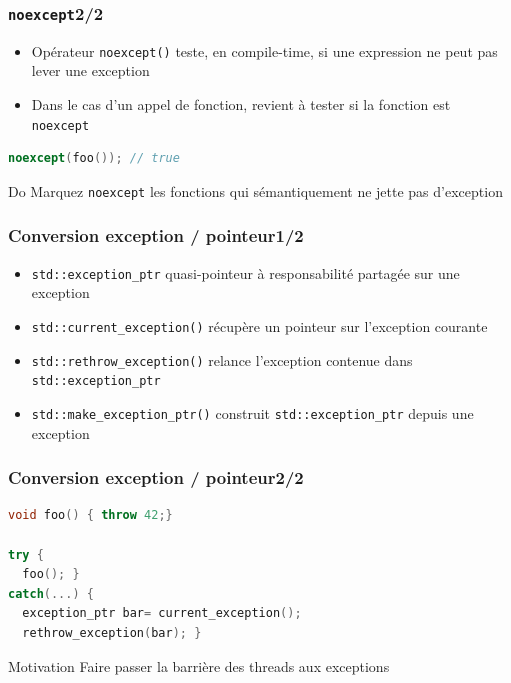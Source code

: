 \documentclass[C++.tex]{subfiles}
\begin{document}
\begin{frame}[fragile]
	\frametitle{\lstinline|noexcept|\titlehfill{}2/2}
	\begin{itemize}
		\item Opérateur \lstinline|noexcept()| teste, en compile-time, si une expression ne peut pas lever une exception
		\item Dans le cas d'un appel de fonction, revient à tester si la fonction est \lstinline|noexcept|

	\end{itemize}

	\begin{lstlisting}[language=C++]
noexcept(foo()); // true\end{lstlisting}

	\begin{exampleblock}{Do}
		Marquez \lstinline|noexcept| les fonctions qui sémantiquement ne jette pas d'exception

	\end{exampleblock}
\end{frame}

\begin{frame}[fragile]
	\frametitle{\og{}Conversion\fg{} exception / pointeur\titlehfill{}1/2}
	\begin{itemize}
		\item \lstinline|std::exception_ptr| quasi-pointeur à responsabilité partagée sur une exception
		\item \lstinline|std::current_exception()| récupère un pointeur sur l'exception courante
		\item \lstinline|std::rethrow_exception()| relance l'exception contenue dans \lstinline|std::exception_ptr| 
		\item \lstinline|std::make_exception_ptr()| construit \lstinline|std::exception_ptr| depuis une exception
	\end{itemize}
\end{frame}

\begin{frame}[fragile]
	\frametitle{\og{}Conversion\fg{} exception / pointeur\titlehfill{}2/2}
	\begin{lstlisting}[language=C++]
void foo() { throw 42;}

try {
  foo(); }
catch(...) {
  exception_ptr bar= current_exception();
  rethrow_exception(bar); } \end{lstlisting}

	\begin{block}{Motivation}
		Faire passer la barrière des threads aux exceptions
	\end{block}
\end{frame}
\end{document}
